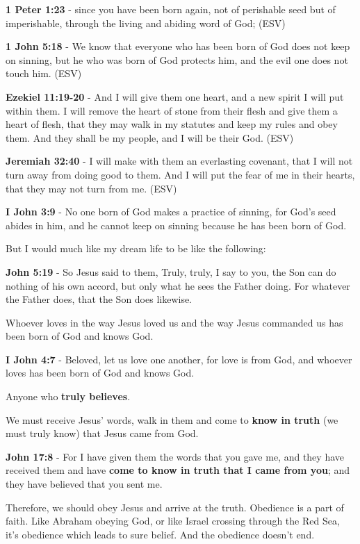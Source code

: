 \documentclass[11pt]{article}
\begin{document}
\textbf{1 Peter 1:23} - since you have been born again, not of perishable seed but of imperishable, through the living and abiding word of God; (ESV)

\textbf{1 John 5:18} - We know that everyone who has been born of God does not keep on sinning, but he who was born of God protects him, and the evil one does not touch him. (ESV)

\textbf{Ezekiel 11:19-20} - And I will give them one heart, and a new spirit I will put within them. I will remove the heart of stone from their flesh and give them a heart of flesh, that they may walk in my statutes and keep my rules and obey them. And they shall be my people, and I will be their God. (ESV)

\textbf{Jeremiah 32:40} - I will make with them an everlasting covenant, that I will not turn away from doing good to them. And I will put the fear of me in their hearts, that they may not turn from me. (ESV)

\textbf{I John 3:9} - No one born of God makes a practice of sinning, for God's seed abides in him, and he cannot keep on sinning because he has been born of God.

But I would much like my dream life to be like the following:

\textbf{John 5:19} - So Jesus said to them, Truly, truly, I say to you, the Son can do nothing of his own accord, but only what he sees the Father doing. For whatever the Father does, that the Son does likewise.

Whoever loves in the way Jesus loved us and the way Jesus commanded us has been born of God and knows God.

\textbf{I John 4:7} - Beloved, let us love one another, for love is from God, and whoever loves has been born of God and knows God.

Anyone who \textbf{truly believes}.

We must receive Jesus' words, walk in them and come to \textbf{know in truth} (we must truly know) that Jesus came from God.

\textbf{John 17:8} - For I have given them the words that you gave me, and they have received them and have \textbf{come to know in truth that I came from you}; and they have believed that you sent me.

Therefore, we should obey Jesus and arrive at the truth. Obedience is a part of faith. Like Abraham obeying God, or like Israel crossing through the Red Sea, it's obedience which leads to sure belief.
And the obedience doesn't end.
\end{document}
